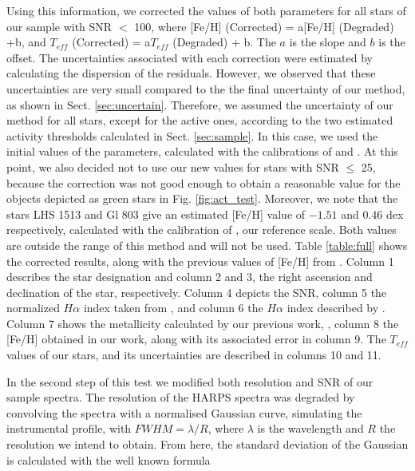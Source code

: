 \documentclass{aa}
\begin{document}
Using this information, we corrected the values of both parameters for all stars of our sample with SNR $<$ 100, where [Fe/H] (Corrected) = a[Fe/H] (Degraded) +b, and $T_{eff}$ (Corrected) = a$T_{eff}$ (Degraded) + b. The $a$ is the slope and $b$ is the offset. The uncertainties associated with each correction were estimated by calculating the dispersion of the residuals. However, we observed that these uncertainties are very small compared to the the final uncertainty of our method, as shown in Sect. \ref{sec:uncertain}. Therefore, we assumed the uncertainty of our method for all stars, except for the active ones, according to the two estimated activity thresholds calculated in Sect. \ref{sec:sample}. In this case, we used the initial values of the parameters, calculated with the calibrations of \citet{Neves-2012} and \citet{Casagrande-2008}. At this point, we also decided not to use our new values for stars with SNR $\leq$ 25, because the correction was not good enough to obtain a reasonable value for the objects depicted as green stars in Fig. \ref{fig:act_test}. Moreover, we note that the stars LHS 1513 and Gl 803 give an estimated [Fe/H] value of $-1.51$ and $0.46$ dex respectively, calculated with the calibration of \citet{Neves-2012}, our reference scale. Both values are outside the range of this method and will not be used. Table \ref{table:full} shows the corrected results, along with the previous values of [Fe/H] from \citet{Neves-2013}. Column 1 describes the star designation and column 2 and 3, the right ascension and declination of the star, respectively. Column 4 depicts the SNR, column 5 the normalized $H\alpha$ index taken from \citet{Reiners-2012}, and column 6 the $H\alpha$ index described by \citet{Gomes_da_Silva-2011}. Column 7 shows the metallicity calculated by our previous work, \citet{Neves-2013}, column 8 the [Fe/H] obtained in our work, along with its associated error in column 9. The $T_{eff}$ values of our stars, and its uncertainties are described in columns 10 and 11.    %

\addtocounter{table}{1}


In the second step of this test we modified both resolution and SNR of our sample spectra. The resolution of the HARPS spectra was degraded by convolving the spectra with a normalised Gaussian curve, simulating the instrumental profile, with $FWHM = \lambda/R$, where $\lambda$ is the wavelength and $R$ the resolution we intend to obtain. %
From here, the standard deviation of the Gaussian is calculated with the well known formula 
\end{document}
